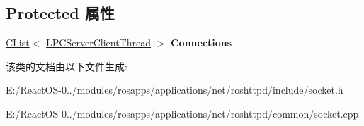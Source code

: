 \subsection*{Protected 属性}
\begin{DoxyCompactItemize}
\item 
\mbox{\label{class_c_server_socket_ab015de1e7510f36a02a57ff45dbab2be}} 
\hyperlink{class_c_list}{C\+List}$<$ \hyperlink{class_c_server_client_thread}{L\+P\+C\+Server\+Client\+Thread} $>$ {\bfseries Connections}
\end{DoxyCompactItemize}


该类的文档由以下文件生成\+:\begin{DoxyCompactItemize}
\item 
E\+:/\+React\+O\+S-\/0../modules/rosapps/applications/net/roshttpd/include/socket.\+h\item 
E\+:/\+React\+O\+S-\/0../modules/rosapps/applications/net/roshttpd/common/socket.\+cpp\end{DoxyCompactItemize}
